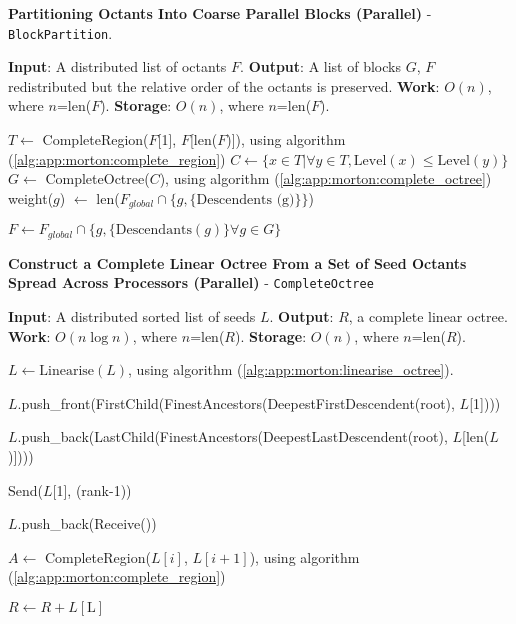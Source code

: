 \begin{algorithm}
    \caption{\textbf{Partitioning Octants Into Coarse Parallel Blocks (Parallel)} - \texttt{BlockPartition}.}
    \label{alg:ch_6:block_partition}
    \begin{algorithmic}
        \STATE \textbf{Input}: A distributed list of octants $F$.
        \STATE \textbf{Output}: A list of blocks $G$, $F$ redistributed but the relative order of the octants is preserved.
        \STATE \textbf{Work}: $O(n)$, where $n$=len($F$).
        \STATE \textbf{Storage}: $O(n)$, where $n$=len($F$).

        \STATE $T \gets $ CompleteRegion($F$[1], $F$[len($F$)]), using algorithm (\ref{alg:app:morton:complete_region})
        \STATE $C \gets \{ x \in T | \forall y \in T, \text{Level}(x) \leq \text{Level}(y) \}$
        \STATE $G \gets $ CompleteOctree($C$), using algorithm (\ref{alg:app:morton:complete_octree})
            weight($g$) $\gets $ len($F_{global} \cap \{ g,  \{ \text{Descendents (g)} \} \}$)
        \ENDFOR

        \STATE $F \gets F_{global} \cap \{ g, \{ \text{Descendants}(g) \} \forall g \in G \}$
    \end{algorithmic}
\end{algorithm}


\begin{algorithm}
    \caption{\textbf{Construct a Complete Linear Octree From a Set of Seed Octants Spread Across Processors (Parallel)} - \texttt{CompleteOctree}}
    \label{alg:app:morton:complete_octree}
    \begin{algorithmic}
        \STATE \textbf{Input}: A distributed sorted list of seeds $L$.
        \STATE \textbf{Output}: $R$, a complete linear octree.
        \STATE \textbf{Work}: $O(n \log n)$, where $n$=len($R$).
        \STATE \textbf{Storage}: $O(n)$, where $n$=len($R$).

        \STATE $L \gets \text{Linearise}(L)$, using algorithm (\ref{alg:app:morton:linearise_octree}).

            \STATE $L$.push\_front(FirstChild(FinestAncestors(DeepestFirstDescendent(root), $L$[1])))
        \ENDIF

            \STATE $L$.push\_back(LastChild(FinestAncestors(DeepestLastDescendent(root), $L$[len($L$)])))
        \ENDIF

            \STATE Send($L$[1], (rank-1))
        \ENDIF

            \STATE $L$.push\_back(Receive())
        \ENDIF

            \STATE $A \gets$ CompleteRegion($L[i]$, $L[i+1]$), using algorithm (\ref{alg:app:morton:complete_region})
        \ENDFOR

            \STATE $R \gets R+L[\text{L}]$
        \ENDIF

    \end{algorithmic}
\end{algorithm}
